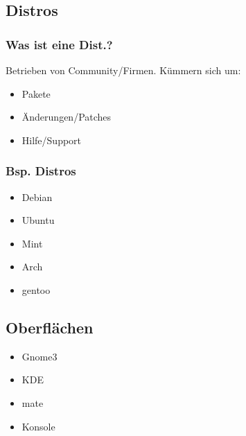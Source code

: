 
\subsection{Distros}
\begin{frame}
\frametitle{Was ist eine Dist.?}
Betrieben von Community/Firmen.
Kümmern sich um: 
\begin{itemize}
 \item Pakete
 \item Änderungen/Patches
 \item Hilfe/Support
\end{itemize}
 
\end{frame}

\begin{frame}
\frametitle{Bsp. Distros}
\begin{itemize}
\item Debian
\item Ubuntu
\item Mint
\item Arch
\item gentoo
\end{itemize}
\end{frame}

\subsection{Oberflächen}
\begin{frame}
\begin{itemize}
\item Gnome3
\item KDE
\item mate
\item Konsole
\end{itemize}
\end{frame}


